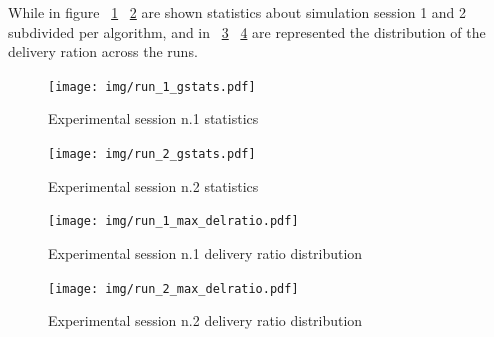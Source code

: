 While in figure ~\ref{fig:run_1_gstats} ~\ref{fig:run_2_gstats} are shown statistics about simulation session 1 and 2 subdivided per algorithm, and in ~\ref{fig:run_1_max_delratio} ~\ref{fig:run_2_max_delratio} are represented the distribution of the delivery ration across the runs.
\begin{figure}[h!]
	\begin{center}
    \texttt{[image: img/run\_1\_gstats.pdf]}
    \caption{Experimental session n.1 statistics}
    \label{fig:run_1_gstats}
  \end{center}
\end{figure}
\begin{figure}[h!]
	\begin{center}
    \texttt{[image: img/run\_2\_gstats.pdf]}
    \caption{Experimental session n.2 statistics}
    \label{fig:run_2_gstats}
  \end{center}
\end{figure}
\newpage
\begin{figure}[h!]
	\begin{center}
    \texttt{[image: img/run\_1\_max\_delratio.pdf]}
    \caption{Experimental session n.1 delivery ratio distribution}
    \label{fig:run_1_max_delratio}
  \end{center}
\end{figure}
\begin{figure}[h!]
	\begin{center}
    \texttt{[image: img/run\_2\_max\_delratio.pdf]}
    \caption{Experimental session n.2 delivery ratio distribution}
    \label{fig:run_2_max_delratio}
  \end{center}
\end{figure}
\newpage